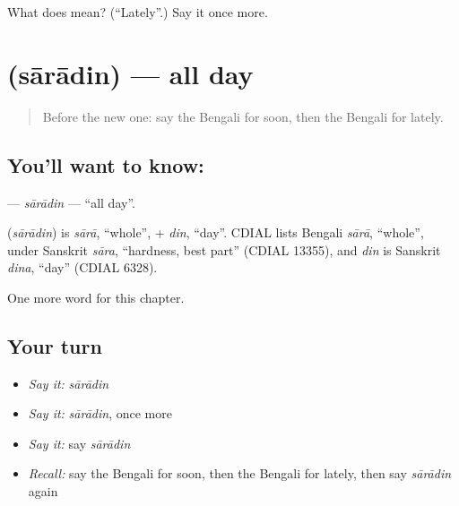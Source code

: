 \begin{tcolorbox}[breakable,colback=teal!4,colframe=teal!35!black,title={Before you move on}]
What does  mean? (\textquotedblleft{}Lately\textquotedblright{}.) Say it once more.
\end{tcolorbox}
\section[\texorpdfstring{\bn{সারাদিন} (sārādin)}{সারাদিন (sārādin)}]{ (sārādin) — all day}

\label{lesson:BN-C95-saradin}



\begin{quote}
Before the new one: say the Bengali for soon, then the Bengali for lately.
\end{quote}

\subsection*{You'll want to know: }
\textbf{} — \emph{sārādin} — \textquotedblleft{}all day\textquotedblright{}.

\begin{cousinweb}
\textbf{} (\emph{sārādin}) is \emph{sārā}, \textquotedblleft{}whole\textquotedblright{}, + \emph{din}, \textquotedblleft{}day\textquotedblright{}. CDIAL lists Bengali \emph{sārā}, \textquotedblleft{}whole\textquotedblright{}, under Sanskrit \emph{sāra}, \textquotedblleft{}hardness, best part\textquotedblright{} (CDIAL 13355), and \emph{din} is Sanskrit \emph{dina}, \textquotedblleft{}day\textquotedblright{} (CDIAL 6328).
\end{cousinweb}

\begin{grammarlens}[title={What you've built}]
One more word for this chapter.
\end{grammarlens}

\subsection*{Your turn}
\begin{itemize}
\raggedright
  \item \emph{Say it:} \emph{sārādin}
  \item \emph{Say it:} \emph{sārādin}, once more
  \item \emph{Say it:} say \emph{sārādin}
  \item \emph{Recall:} say the Bengali for soon, then the Bengali for lately, then say \emph{sārādin} again
\end{itemize}

